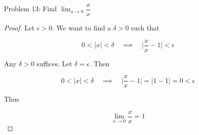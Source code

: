 \usepackage{amsthm}

Problem 13: Find $\lim_{x \rightarrow 0} \dfrac{x}{x}$

\begin{proof}
Let $\epsilon > 0$. We want to find a $\delta > 0$ such that

$$ 0 < |x| < \delta \quad \implies \quad \Bigg|\frac{x}{x} - 1\Bigg| < \epsilon $$

Any $\delta > 0$ suffices. Let $\delta = \epsilon$. Then

$$ 0 < |x| < \delta \quad \implies \quad \Bigg|\frac{x}{x} - 1\Bigg| = \Bigg|1 - 1\Bigg| = 0 < \epsilon $$

Thus

$$\lim_{x \rightarrow 0} \frac{x}{x} = 1$$
\end{proof}
